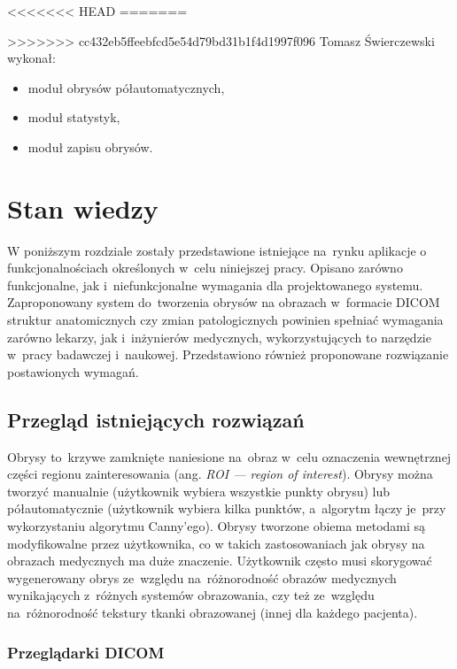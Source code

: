 \documentclass[a4paper,11pt,twoside,openright]{report}
\newcommand\blankpage{%
    \null
    \thispagestyle{empty}%
    \newpage}
\theoremstyle{definition}
\begin{document}
<<<<<<< HEAD
=======

>>>>>>> cc432eb5ffeebfcd5e54d79bd31b1f4d1997f096
Tomasz Świerczewski wykonał:

\begin{itemize}[noitemsep]
\item moduł obrysów półautomatycznych,
\item moduł statystyk,
\item moduł zapisu obrysów.
\end{itemize}

\afterpage{\blankpage}

\chapter {Stan wiedzy}

W poniższym rozdziale zostały przedstawione istniejące na~rynku aplikacje o
funkcjonalnościach określonych w~celu niniejszej pracy. Opisano zarówno funkcjonalne, jak i~niefunkcjonalne
wymagania dla projektowanego systemu. Zaproponowany system do~tworzenia obrysów
na obrazach w~formacie DICOM struktur anatomicznych czy zmian patologicznych
powinien spełniać wymagania zarówno lekarzy, jak i~inżynierów medycznych, wykorzystujących
to narzędzie w~pracy badawczej i~naukowej. Przedstawiono również proponowane rozwiązanie
postawionych wymagań.

\section {Przegląd istniejących rozwiązań}

Obrysy to~krzywe zamknięte naniesione na~obraz w~celu oznaczenia wewnętrznej części
regionu zainteresowania (ang. \textit{ROI --- region of interest}).
Obrysy można tworzyć manualnie (użytkownik wybiera wszystkie punkty obrysu) lub
półautomatycznie (użytkownik wybiera kilka punktów, a~algorytm łączy je~przy wykorzystaniu
algorytmu Canny'ego). Obrysy tworzone obiema metodami są modyfikowalne przez użytkownika,
co w takich zastosowaniach jak obrysy na obrazach medycznych ma duże znaczenie. Użytkownik często musi skorygować
wygenerowany obrys ze~względu na~różnorodność obrazów medycznych wynikających z~różnych systemów
obrazowania, czy też ze~względu na~różnorodność tekstury tkanki obrazowanej (innej dla każdego pacjenta).

\subsection {Przeglądarki DICOM}
\end{document}

